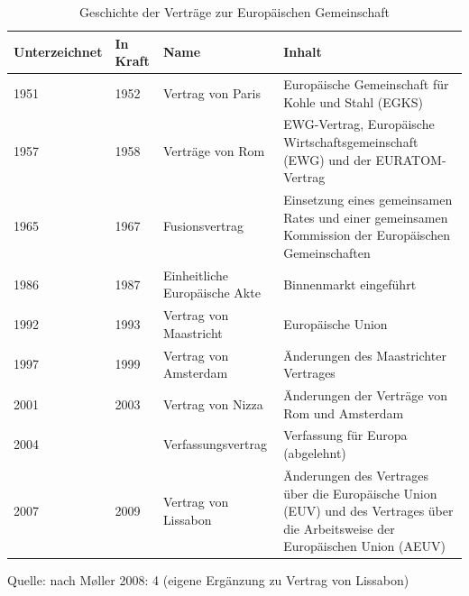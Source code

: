 \begin{table}[!hbt]\vspace{1ex}\centering
\caption{Geschichte der Verträge zur Europäischen Gemeinschaft}
\small
\begin{tabular}{|p{12mm}|p{12mm}|p{4cm}|p{7cm}|}\hline
Unter\-zeichnet &In Kraft & Name&Inhalt\\\hline
1951&1952&Vertrag von Paris&Europäische Gemeinschaft für Kohle und Stahl (EGKS)\\\hline
1957&1958&Verträge von Rom&EWG-Vertrag, Europäische Wirtschaftsgemeinschaft (EWG) und der EURATOM-Vertrag\\\hline
1965&1967&Fusionsvertrag&Einsetzung eines gemeinsamen Rates und einer gemeinsamen Kommission der Europäischen Gemeinschaften\\\hline
1986&1987&Einheitliche Europäische Akte&Binnenmarkt eingeführt\\\hline
1992&1993&Vertrag von Maastricht&Europäische Union\\\hline
1997&1999&Vertrag von Amsterdam&Änderungen des Maastrichter Vertrages\\\hline
2001&2003&Vertrag von Nizza&Änderungen der Verträge von Rom und Amsterdam\\\hline
2004& &Verfassungsvertrag&Verfassung für Europa (abgelehnt)\\\hline
2007&2009&Vertrag von Lissabon&Änderungen des Vertrages über die Europäische Union (EUV) und des Vertrages über die Arbeitsweise der Europäischen Union (AEUV)\\\hline
\end{tabular}
\end{table}
Quelle: nach M\o ller 2008: 4 (eigene Ergänzung zu Vertrag von Lissabon)

